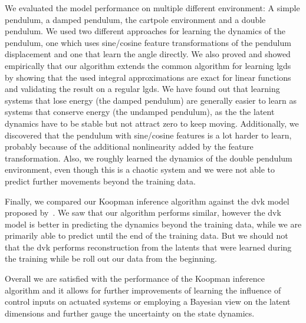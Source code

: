 We evaluated the model performance on multiple different environment: A simple pendulum, a damped pendulum, the cartpole environment and a double pendulum. We used two different approaches for learning the dynamics of the pendulum, one which uses sine/cosine feature transformations of the pendulum displacement and one that learn the angle directly. We also proved and showed empirically that our algorithm extends the common algorithm for learning \ac{lgds}~\cite{ghahramaniParameterEstimationLinear1996,minkaHiddenMarkovModels1999} by showing that the used  integral approximations are exact for linear functions and validating the result on a regular \ac{lgds}. We have found out that learning systems that lose energy (\eg the damped pendulum) are generally easier to learn as systems that conserve energy (\eg the undamped pendulum), as the the latent dynamics have to be stable but not attract zero to keep moving. Additionally, we discovered that the pendulum with sine/cosine features is a lot harder to learn, probably because of the additional nonlinearity added by the feature transformation. Also, we roughly learned the dynamics of the double pendulum environment, even though this is a chaotic system and we were not able to predict further movements beyond the training data.

Finally, we compared our Koopman inference algorithm against the \acl{dvk} model proposed by~\cite{mortonDeepVariationalKoopman2019a}. We saw that our algorithm performs similar, however the \ac{dvk} model is better in predicting the dynamics beyond the training data, while we are primarily able to predict until the end of the training data. But we should not that the \ac{dvk} performs reconstruction from the latents that were learned during the training while be roll out our data from the beginning.

Overall we are satisfied with the performance of the Koopman inference algorithm and it allows for further improvements of learning the influence of control inputs on actuated systems or employing a Bayesian view on the latent dimensions and further gauge the uncertainty on the state dynamics.